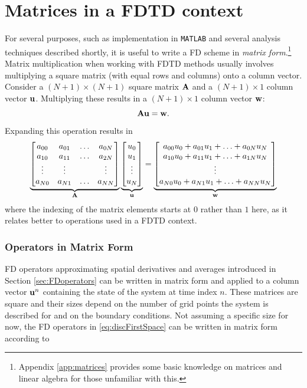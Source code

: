 \section{Matrices in a FDTD context}
For several purposes, such as implementation in \texttt{MATLAB} and several analysis techniques described shortly, it is useful to write a FD scheme in \textit{matrix form}.\footnote{Appendix \ref{app:matrices} provides some basic knowledge on matrices and linear algebra for those unfamiliar with this.} Matrix multiplication when working with FDTD methods usually involves multiplying a square matrix (with equal rows and columns) onto a column vector. Consider a $(N+1)\times (N+1)$ square matrix $\mathbf{A}$ and a $(N+1) \times 1$ column vector $\mathbf{u}$. Multiplying these results in a $(N+1) \times 1$ column vector $\mathbf{w}$:
\begin{equation}
    \mathbf{A}\mathbf{u} = \mathbf{w}.
\end{equation}
Expanding this operation results in
\begin{equation}
    \underbrace{\begin{bmatrix}
        a_{00} & a_{01} & \hdots & a_{0N}\\
        a_{10} & a_{11} & \hdots & a_{2N}\\
        \vdots & \vdots & &\vdots\\
        a_{N0} & a_{N1} & \hdots & a_{NN}
    \end{bmatrix}}_{\mathbf{A}}
    \underbrace{\begin{bmatrix}
        u_0\\
        u_1\\
        \vdots\\
        u_N
    \end{bmatrix}}_{\mathbf{u}} = 
    \underbrace{\begin{bmatrix}
        a_{00}u_0 + a_{01}u_1 + \hdots + a_{0N}u_N\\
        a_{10}u_0 + a_{11}u_1 + \hdots + a_{1N}u_N\\
        \vdots\\
        a_{N0}u_0 + a_{N1}u_1 + \hdots + a_{NN}u_N
    \end{bmatrix}}_{\mathbf{w}}
\end{equation}
where the indexing of the matrix elements starts at $0$ rather than $1$ here, as it relates better to operations used in a FDTD context.

\subsubsection{Operators in Matrix Form}
FD operators approximating spatial derivatives and averages introduced in Section \ref{sec:FDoperators} can be written in matrix form and applied to a column vector $\mathbf{u}^n$ containing the state of the system at time index $n$. These matrices are square and their sizes depend on the number of grid points the system is described for and on the boundary conditions. Not assuming a specific size for now, the FD operators in \eqref{eq:discFirstSpace} can be written in matrix form according to
\setstacktabbedgap{4pt}
\def\lrgap{\kern3pt}

